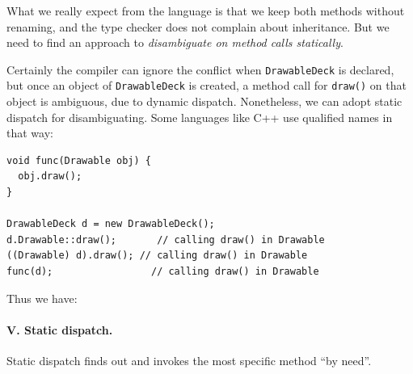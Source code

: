 What we really expect from the language is that we keep both methods
without renaming, and the type checker does not complain about 
inheritance. But we need to find an approach to \emph{disambiguate on method
calls statically}.

Certainly the compiler can ignore the conflict when
\lstinline|DrawableDeck| is declared, but once an object of
\lstinline|DrawableDeck| is created, a method call for
\lstinline|draw()| on that object is ambiguous, due to dynamic
dispatch. Nonetheless, we can adopt static dispatch for
disambiguating. Some languages like C++ use qualified names in that
way:

\vspace{3pt}\begin{lstlisting}
void func(Drawable obj) {
  obj.draw();
}

DrawableDeck d = new DrawableDeck();
d.Drawable::draw();       // calling draw() in Drawable
((Drawable) d).draw(); // calling draw() in Drawable
func(d);                 // calling draw() in Drawable
\end{lstlisting}\vspace{3pt}
Thus we have: \paragraph{V. Static dispatch.} Static dispatch finds out and invokes the most specific method ``by need''.

